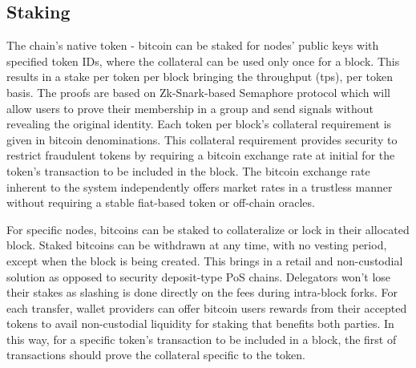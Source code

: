 \documentclass[a4paper, 10pt]{extarticle}
\begin{document}
\subsection{Staking}
The chain's native token - bitcoin can be staked for nodes' public keys with specified token IDs, where the collateral can be used only once for a block. This results in a stake per token per block bringing the throughput (tps), per token basis. The proofs are based on Zk-Snark-based Semaphore protocol \cite{semaphore} which will allow users to prove their membership in a group and send signals without revealing the original identity. Each token per block's collateral requirement is given in bitcoin denominations. This collateral requirement provides security to restrict fraudulent tokens by requiring a bitcoin exchange rate at initial for the token's transaction to be included in the block. The bitcoin exchange rate inherent to the system independently offers market rates in a trustless manner without requiring a stable fiat-based token or off-chain oracles. 

For specific nodes, bitcoins can be staked to collateralize or lock in their allocated block. Staked bitcoins can be withdrawn at any time, with no vesting period, except when the block is being created. This brings in a retail and non-custodial solution as opposed to security deposit-type PoS chains. Delegators won't lose their stakes as slashing is done directly on the fees during intra-block forks. For each transfer, wallet providers can offer bitcoin users rewards from their accepted tokens to avail non-custodial liquidity for staking that benefits both parties. In this way, for a specific token's transaction to be included in a block, the first of transactions should prove the collateral specific to the token.
\end{document}
